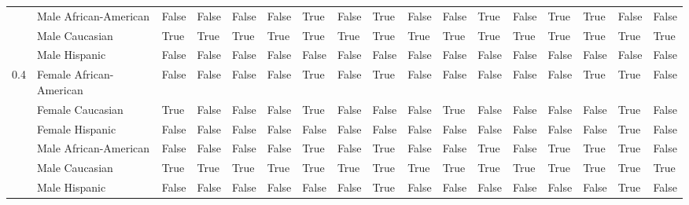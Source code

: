 \begin{tabular}{lllllllllllllllll}
    & Male African-American &       False &           False &                  False &               False &        True &                False &        True &       False &             False &        True &         False &           True &        True &          False &       False \\
    & Male Caucasian &        True &            True &                   True &                True &        True &                 True &        True &        True &              True &        True &          True &           True &        True &           True &        True \\
    & Male Hispanic &       False &           False &                  False &               False &       False &                False &       False &       False &             False &       False &         False &          False &       False &          False &       False \\
0.4 & Female African-American &       False &           False &                  False &               False &        True &                False &        True &       False &             False &       False &         False &          False &        True &           True &       False \\
    & Female Caucasian &        True &           False &                  False &               False &        True &                False &       False &       False &              True &       False &         False &          False &       False &           True &       False \\
    & Female Hispanic &       False &           False &                  False &               False &       False &                False &       False &       False &             False &       False &         False &          False &       False &           True &       False \\
    & Male African-American &       False &           False &                  False &               False &        True &                False &        True &       False &             False &        True &         False &           True &        True &           True &       False \\
    & Male Caucasian &        True &            True &                   True &                True &        True &                 True &        True &        True &              True &        True &          True &           True &        True &           True &        True \\
    & Male Hispanic &       False &           False &                  False &               False &       False &                False &        True &       False &             False &       False &         False &          False &       False &           True &       False \\
\bottomrule
\end{tabular}
